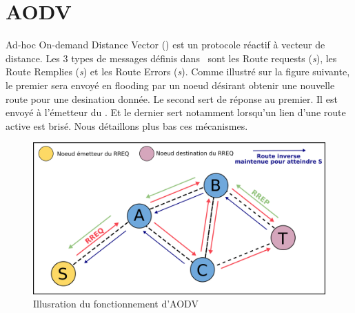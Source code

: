 \chapter{AODV}
    Ad-hoc On-demand Distance Vector (\aodv) est un protocole réactif à vecteur de distance.
    Les 3 types de messages définis dans \aodv\ sont les Route requests (\textit{\rreq s}),
    les Route Remplies (\textit{\rrep s}) et les Route Errors (\textit{\rerr s}).
    Comme illustré sur la figure suivante, le premier sera envoyé en flooding par un noeud
    désirant obtenir une nouvelle route pour
    une desination donnée. Le second sert de réponse au premier. Il est envoyé à l'émetteur du
    \rreq. Et le dernier sert notamment lorsqu'un lien d'une route active est brisé. 
    Nous détaillons plus bas ces mécanismes.
    \vspace{1cm}
    \begin{figure}[H]
        \centering
        \includegraphics[scale=0.35]{images/aodv.png}
        \caption{Illusration du fonctionnement d'AODV}
        \label{aodv}
    \end{figure}
    
    
    \vspace{0.5cm}
